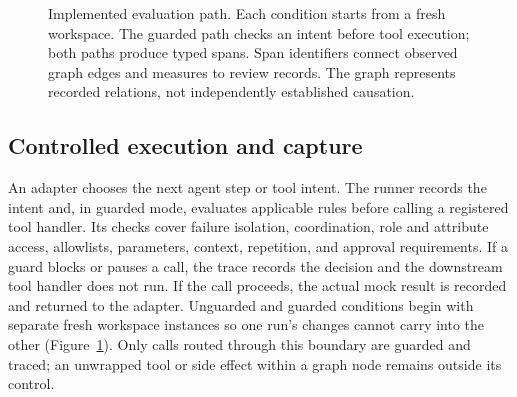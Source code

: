 \begin{figure}[t]
\centering
{}
\caption{Implemented evaluation path. Each condition starts from a fresh workspace. The guarded path checks an intent before tool execution; both paths produce typed spans. Span identifiers connect observed graph edges and measures to review records. The graph represents recorded relations, not independently established causation.}
\label{fig:pipeline}
\end{figure}

\subsection{Controlled execution and capture}

An adapter chooses the next agent step or tool intent. The runner records the intent and, in guarded mode, evaluates applicable rules before calling a registered tool handler. Its checks cover failure isolation, coordination, role and attribute access, allowlists, parameters, context, repetition, and approval requirements. If a guard blocks or pauses a call, the trace records the decision and the downstream tool handler does not run. If the call proceeds, the actual mock result is recorded and returned to the adapter. Unguarded and guarded conditions begin with separate fresh workspace instances so one run's changes cannot carry into the other (Figure~\ref{fig:pipeline}). Only calls routed through this boundary are guarded and traced; an unwrapped tool or side effect within a graph node remains outside its control.

